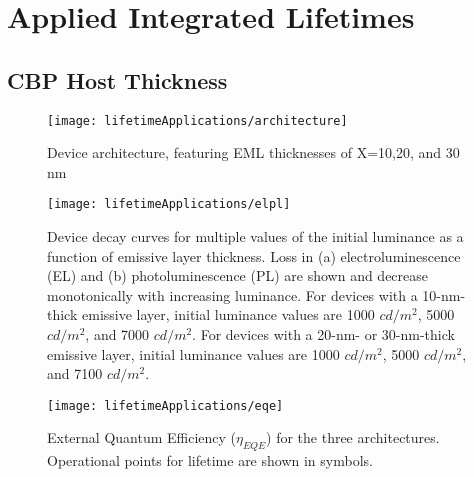 \documentclass[../thesis.tex]{subfiles}
\begin{document}
\chapter{Applied Integrated Lifetimes}\label{sec:decoupling_applications}

\section{CBP Host Thickness}\label{sec:cbp_host}

\begin{figure}[ht]
\centering
\texttt{[image: lifetimeApplications/architecture]}
\caption{Device architecture, featuring EML thicknesses of X=10,20, and 30 nm}
\label{fig:architecture}
\end{figure}

\begin{figure}[ht]
\centering
\texttt{[image: lifetimeApplications/elpl]}
\caption{Device decay curves for multiple values of the initial luminance as a function of emissive layer thickness.  Loss in (a) electroluminescence (EL) and (b) photoluminescence (PL) are shown and decrease monotonically with increasing luminance.  For devices with a 10-nm-thick emissive layer, initial luminance values are 1000 $cd/m^2$, 5000 $cd/m^2$, and 7000 $cd/m^2$.  For devices with a 20-nm- or 30-nm-thick emissive layer, initial luminance values are 1000 $cd/m^2$, 5000 $cd/m^2$, and 7100 $cd/m^2$. }
\label{fig:elpl}
\end{figure}

\begin{figure}[ht]
\centering
\texttt{[image: lifetimeApplications/eqe]}
\caption{External Quantum Efficiency ($\eta_{EQE}$) for the three architectures.  Operational points for lifetime are shown in symbols.}
\label{fig:eqe}
\end{figure}
\end{document}
